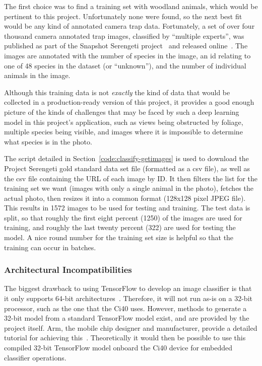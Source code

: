 The first choice was to find a training set with woodland animals, which
would be pertinent to this project. Unfortunately none were found, so the
next best fit would be any kind of annotated camera trap data. Fortunately, a
set of over four thousand camera annotated trap images, classified by
``multiple experts'', was published as part of the Snapshot Serengeti
project~\cite{swanson2015snapshot} and released
online~\cite{swanson2015data}. The images are annotated with the number of
species in the image, an id relating to one of 48 species in the dataset (or
``unknown''), and the number of individual animals in the image.

Although this training data is not \textit{exactly} the kind of data that
would be collected in a production-ready version of this project, it provides
a good enough picture of the kinds of challenges that may be faced by such a
deep learning model in this project's application, such as views being
obstructed by foliage, multiple species being visible, and images where it is
impossible to determine what species is in the photo.

The script detailed in Section~\ref{code:classify-getimages} is used to
download the Project Serengeti gold standard data set file (formatted as a
\acrshort{csv} file), as well as the \acrshort{csv} file containing the URL
of each image by ID. It then filters the list for the training set we want
(images with only a single animal in the photo), fetches the actual photo,
then resizes it into a common format (128x128 pixel JPEG file). This results
in 1572 images to be used for testing and training. The test data is split,
so that roughly the first eight percent (1250) of the images are used for
training, and roughly the last twenty percent (322) are used for testing the
model. A nice round number for the training set size is helpful so that the
training can occur in batches.

\subsubsection{Architectural Incompatibilities}
The biggest drawback to using TensorFlow to develop an image classifier is
that it only supports 64-bit architectures~\cite{tensorflow-sysreq}.
Therefore, it will not run as-is on a 32-bit processor, such as the one that
the Ci40 uses. However, methods to generate a 32-bit model from a standard
TensorFlow model exist, and are provided by the project itself. Arm, the
mobile chip designer and manufacturer, provide a detailed tutorial for
achieving this~\cite{arm-tensorflow32bit}. Theoretically it would then be
possible to use this compiled 32-bit TensorFlow model onboard the Ci40 device
for embedded classifier operations.

